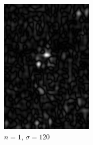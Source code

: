 \documentclass[
	12pt, %
]{style/fphw}
\begin{document}
\begin{figure}[H]
\begin{subfigure}[b]{.22\textwidth}
             \includegraphics[width=\textwidth]{Q5_3_1_120.png}
             \caption{$n=1$, $\sigma=120$}
             \label{Q5_3_1_120.tif}
         \end{subfigure}
     \vfill
         \begin{subfigure}[b]{.22\textwidth}
             \centering

\end{subfigure}
\end{figure}
\end{document}
